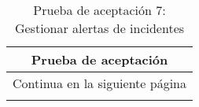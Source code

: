 \begin{longtable}{|p{6.7cm}|p{6.7cm}|}
    \caption{Prueba de aceptación 7: Gestionar alertas de incidentes} \label{tab:prueba-7}
    \\
    \hline
    \multicolumn{2}{|c|}{\textbf{Prueba de aceptación}}                                                                                                                                                                                                                                                                            \\
    \hline

    \endfirsthead

    \hline
    \endhead

    \hline
    \multicolumn{2}{|c|}{{Continua en la siguiente página}}                                                                                                                                                                                                                                                                        \\
    \hline
    \endfoot


\end{longtable}
